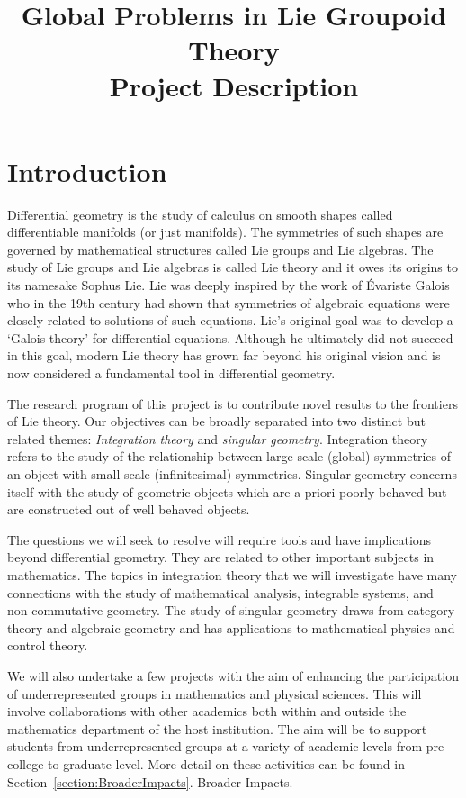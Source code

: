 \documentclass[11pt, letterpaper]{article}
\title{Global Problems in Lie Groupoid Theory\\Project Description}
\date{}
\begin{document}
\maketitle
\section{Introduction}
Differential geometry is the study of calculus on smooth shapes called differentiable manifolds (or just manifolds). The symmetries of such shapes are governed by mathematical structures called Lie groups and Lie algebras. The study of Lie groups and Lie algebras is called Lie theory and it owes its origins to its namesake Sophus Lie. Lie was deeply inspired by the work of Évariste Galois who in the 19th century had shown that symmetries of algebraic equations were closely related to solutions of such equations. Lie's original goal was to develop a `Galois theory' for differential equations. Although he ultimately did not succeed in this goal, modern Lie theory has grown far beyond his original vision and is now considered a fundamental tool in differential geometry. 

The research program of this project is to contribute novel results to the frontiers of Lie theory. Our objectives can be broadly separated into two distinct but related themes: \emph{Integration theory} and \emph{singular geometry}. Integration theory refers to the study of the relationship between large scale (global) symmetries of an object with small scale (infinitesimal) symmetries. Singular geometry concerns itself with the study of geometric objects which are a-priori poorly behaved but are constructed out of well behaved objects.

The questions we will seek to resolve will require tools and have implications beyond differential geometry. They are related to other important subjects in mathematics. The topics in integration theory that we will investigate have many connections with the study of mathematical analysis, integrable systems, and non-commutative geometry. The study of singular geometry draws from category theory and algebraic geometry and has applications to mathematical physics and control theory.

We will also undertake a few projects with the aim of enhancing the participation of underrepresented groups in mathematics and physical sciences. This will involve collaborations with other academics both within and outside the mathematics department of the host institution. The aim will be to support students from underrepresented groups at a variety of academic levels from pre-college to graduate level. More detail on these activities can be found in Section~\ref{section:BroaderImpacts}. Broader Impacts. 
\end{document}
